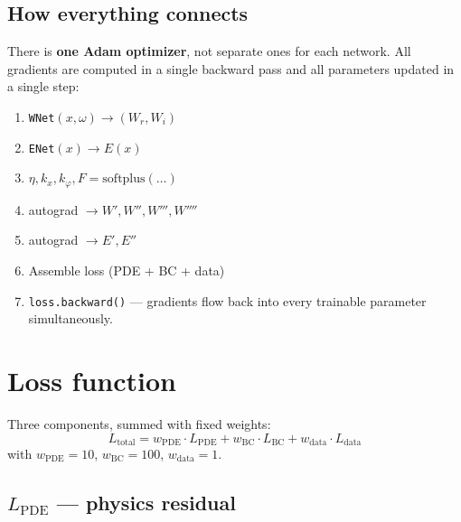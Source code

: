 \documentclass[11pt,a4paper]{article}
\begin{document}
\subsection{How everything connects}

There is \textbf{one Adam optimizer}, not separate ones for each network. All gradients are computed in a single backward pass and all parameters updated in a single step:
\begin{enumerate}[leftmargin=*, itemsep=2pt]
\item \texttt{WNet}$(x, \omega) \to (W_r, W_i)$
\item \texttt{ENet}$(x) \to E(x)$
\item $\eta, k_x, k_\varphi, F = \text{softplus}(\dots)$
\item autograd $\to W', W'', W''', W''''$
\item autograd $\to E', E''$
\item Assemble loss (PDE + BC + data)
\item \texttt{loss.backward()} --- gradients flow back into every trainable parameter simultaneously.
\end{enumerate}

\section{Loss function}

Three components, summed with fixed weights:
\begin{equation}
L_\text{total} = w_\text{PDE} \cdot L_\text{PDE} + w_\text{BC} \cdot L_\text{BC} + w_\text{data} \cdot L_\text{data}
\label{eq:total_loss}
\end{equation}
with $w_\text{PDE} = 10$, $w_\text{BC} = 100$, $w_\text{data} = 1$.

\subsection{\texorpdfstring{$L_\text{PDE}$}{L\_PDE} --- physics residual}
\end{document}
